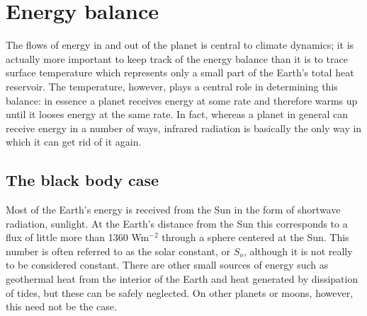 \documentclass[12pt]{book}
\begin{document}

\chapter{Energy balance}
\label{chapter:energybalance}
The flows of energy in and out of the planet is central to climate dynamics; it is actually more important to keep track of the energy balance than it is to trace surface temperature which  represents only a small part of the Earth's total heat reservoir. The temperature, however, plays a central role in determining this balance: in essence a planet receives energy at some rate and therefore warms up until it looses energy at the same rate. In fact, whereas a planet in general can receive energy in a number of ways, infrared radiation is basically the only way in which it can get rid of it again.

\section{The black body case}
Most of the Earth's energy is received from the Sun in the form of shortwave radiation, sunlight. At the Earth's distance from the Sun this corresponds to a flux of little more than 1360 Wm$^{-2}$ through a sphere centered at the Sun. This number is often referred to as the solar constant, or $S_o$, although it is not really to be considered constant. There are other small sources of energy such as geothermal heat from the interior of the Earth and heat generated by dissipation of tides, but these can be safely neglected. On other planets or moons, however, this need not be the case.
\end{document}
